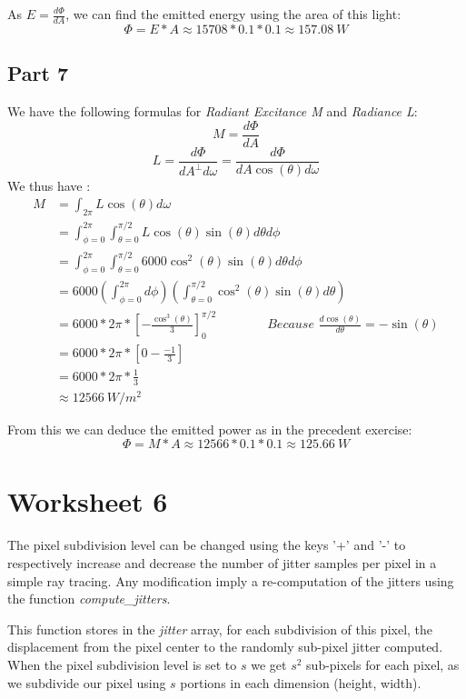 \documentclass[a4,12pt]{article}
\begin{document}
	As $E = \frac{d\Phi}{dA}$, we can find the emitted energy using the area of this light:
	$$
	\Phi = E*A \approx 15708*0.1*0.1 \approx \boxed{157.08\ W}
	$$
	
	\subsection{Part 7}
	We have the following formulas for \textit{Radiant Excitance M} and \textit{Radiance L}:
	$$
	M = \frac{d\Phi}{dA}
	$$
	$$
	L = \frac{d\Phi}{dA^\perp d\omega} = \frac{d\Phi}{dA \cos(\theta)d\omega}
	$$
	We thus have :
	\begin{align*}
		M &= \int_{2\pi} L\cos(\theta)d\omega\\
		&= \int_{\phi = 0}^{2\pi}\int_{\theta = 0}^{\pi/2} L \cos(\theta) \sin(\theta) d\theta d\phi\\
		&= \int_{\phi = 0}^{2\pi}\int_{\theta = 0}^{\pi/2} 6000 \cos^2(\theta) \sin(\theta) d\theta d\phi\\
		&= 6000\left(\int_{\phi = 0}^{2\pi} d\phi\right)\left(\int_{\theta = 0}^{\pi/2}\cos^2(\theta) \sin(\theta) d\theta\right)\\
		&= 6000*2\pi*\left[-\frac{\cos^3(\theta)}{3}\right]_{0}^{\pi/2} \quad \hspace{2em}\quad \textit{Because } \frac{d\cos(\theta)}{d\theta} = -\sin(\theta)\\
		&= 6000*2\pi*[0 - \frac{-1}{3}]\\
		&= 6000*2\pi*\frac{1}{3}\\
		&\approx \boxed{12566\ W/m^2}
	\end{align*}
	
	From this we can deduce the emitted power as in the precedent exercise:
	$$
	\Phi = M * A \approx 12566*0.1*0.1 \approx \boxed{125.66\ W}
	$$
	
	\section{Worksheet 6}
	The pixel subdivision level can be changed using the keys '+' and '-' to respectively increase and decrease the number of jitter samples per pixel in a simple ray tracing. Any modification imply a re-computation of the jitters using the function \textit{compute\_jitters}.
	
	This function stores in the \textit{jitter} array, for each subdivision of this pixel, the displacement from the pixel center to the randomly sub-pixel jitter computed. When the pixel subdivision level is set to $s$ we get $s^2$ sub-pixels for each pixel, as we subdivide our pixel using $s$ portions in each dimension (height, width).
	
\end{document}
